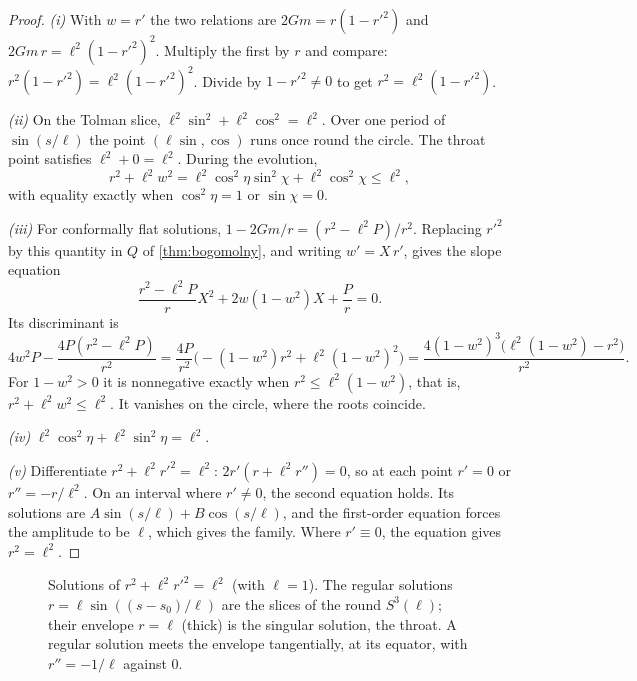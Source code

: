 \begin{proof}
\emph{(i)} With $w=r'$ the two relations are $2Gm=r(1-r'^2)$ and $2Gm\,r=\ell^2(1-r'^2)^2$. Multiply the first by $r$ and compare: $r^2(1-r'^2)=\ell^2(1-r'^2)^2$. Divide by $1-r'^2\ne0$ to get $r^2=\ell^2(1-r'^2)$.

\emph{(ii)} On the Tolman slice, $\ell^2\sin^2+\ell^2\cos^2=\ell^2$. Over one period of $\sin(s/\ell)$ the point $(\ell\sin,\cos)$ runs once round the circle. The throat point satisfies $\ell^2+0=\ell^2$. During the evolution,
\[
r^2+\ell^2w^2=\ell^2\cos^2\eta\sin^2\chi+\ell^2\cos^2\chi\le\ell^2 ,
\]
with equality exactly when $\cos^2\eta=1$ or $\sin\chi=0$.

\emph{(iii)} For conformally flat solutions, $1-2Gm/r=(r^2-\ell^2P)/r^2$. Replacing $r'^2$ by this quantity in $Q$ of \cref{thm:bogomolny}, and writing $w'=X\,r'$, gives the slope equation
\[
\frac{r^2-\ell^2P}rX^2+2w(1-w^2)X+\frac Pr=0 .
\]
Its discriminant is
\[
4w^2P-\frac{4P(r^2-\ell^2P)}{r^2}=\frac{4P}{r^2}\bigl(-(1-w^2)r^2+\ell^2(1-w^2)^2\bigr)=\frac{4(1-w^2)^3\bigl(\ell^2(1-w^2)-r^2\bigr)}{r^2}.
\]
For $1-w^2>0$ it is nonnegative exactly when $r^2\le\ell^2(1-w^2)$, that is, $r^2+\ell^2w^2\le\ell^2$. It vanishes on the circle, where the roots coincide.

\emph{(iv)} $\ell^2\cos^2\eta+\ell^2\sin^2\eta=\ell^2$.

\emph{(v)} Differentiate $r^2+\ell^2r'^2=\ell^2$: $2r'(r+\ell^2r'')=0$, so at each point $r'=0$ or $r''=-r/\ell^2$. On an interval where $r'\ne0$, the second equation holds. Its solutions are $A\sin(s/\ell)+B\cos(s/\ell)$, and the first-order equation forces the amplitude to be $\ell$, which gives the family. Where $r'\equiv0$, the equation gives $r^2=\ell^2$.
\end{proof}


\begin{figure}[t]
\centering
{}
\caption{Solutions of $r^2+\ell^2r'^2=\ell^2$ (with $\ell=1$). The regular solutions $r=\ell\sin((s-s_0)/\ell)$ are the slices of the round $S^3(\ell)$; their envelope $r=\ell$ (thick) is the singular solution, the throat. A regular solution meets the envelope tangentially, at its equator, with $r''=-1/\ell$ against $0$.}
\label{fig:envelope}
\end{figure}

